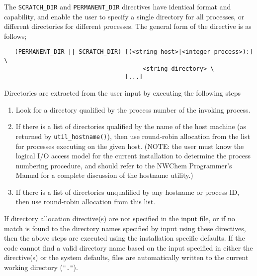 The \verb+SCRATCH_DIR+ and \verb+PERMANENT_DIR+ directives have
identical format and capability, and enable the user to specify a single
directory for all processes, or different directories for different
processes.  The general form of the directive is as follows;

\begin{verbatim}
   (PERMANENT_DIR || SCRATCH_DIR) [(<string host>|<integer process>):] \
                                       <string directory> \ 
                                  [...]
\end{verbatim}

Directories are extracted from the user input by executing the
following steps
\begin{enumerate}
\item Look for a directory qualified by the process number of the
  invoking process.
\item If there is a list of directories qualified by the name of the
  host machine (as returned by \verb+util_hostname()+), then use
  round-robin allocation from the list for processes executing on the
  given host.  (NOTE: the user must know the logical I/O access model
for the current installation to determine the process numbering procedure,
and should refer to the NWChem Programmer's Manual for a complete
discussion of the hostname utility.)
\item If there is a list of directories unqualified by any hostname
  or process ID, then use round-robin allocation from this list.
\end{enumerate}
If directory allocation directive(s) are not specified in the
input file, or if no match is found to the directory names specified by 
input using these directives,
then the above steps are executed using the installation specific
defaults.  If the code cannot find a valid directory name based on the
input specified in either the directive(s) or the system defaults, files are
automatically written to the current working directory (\verb+"."+).

